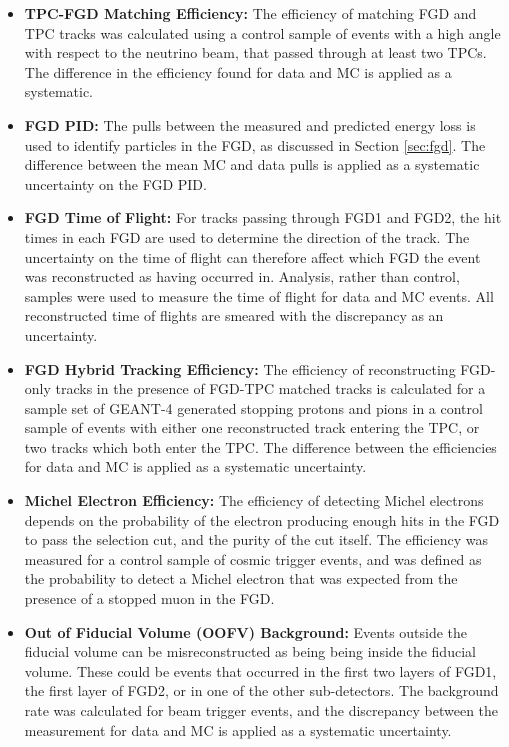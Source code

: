 \begin{itemize}
\item \textbf{TPC-FGD Matching Efficiency:} The efficiency of matching FGD and TPC tracks was calculated using a control sample of events with a high angle with respect to the neutrino beam, that passed through at least two TPCs. The difference in the efficiency found for data and MC is applied as a systematic.

\item \textbf{FGD PID:} The pulls between the measured and predicted energy loss is used to identify particles in the FGD, as discussed in Section \ref{sec:fgd}. The difference between the mean MC and data pulls is applied as a systematic uncertainty on the FGD PID.

\item \textbf{FGD Time of Flight:} For tracks passing through FGD1 and FGD2, the hit times in each FGD are used to determine the direction of the track. The uncertainty on the time of flight can therefore affect which FGD the event was reconstructed as having occurred in. Analysis, rather than control, samples were used to measure the time of flight for data and MC events. All reconstructed time of flights are smeared with the discrepancy as an uncertainty.

\item \textbf{FGD Hybrid Tracking Efficiency:} The efficiency of reconstructing FGD-only tracks in the presence of FGD-TPC matched tracks is calculated for a sample set of \textsc{GEANT-4} generated stopping protons and pions in a control sample of events with either one reconstructed track entering the TPC, or two tracks which both enter the TPC. The difference between the efficiencies for data and MC is applied as a systematic uncertainty.

\item \textbf{Michel Electron Efficiency:} The efficiency of detecting Michel electrons depends on the probability of the electron producing enough hits in the FGD to pass the selection cut, and the purity of the cut itself. The efficiency was measured for a control sample of cosmic trigger events, and was defined as the probability to detect a Michel electron that was expected from the presence of a stopped muon in the FGD.

\item \textbf{Out of Fiducial Volume (OOFV) Background:} Events outside the fiducial volume can be misreconstructed as being being inside the fiducial volume. These could be events that occurred in the first two layers of FGD1, the first layer of FGD2, or in one of the other sub-detectors. The background rate was calculated for beam trigger events, and the discrepancy between the measurement for data and MC is applied as a systematic uncertainty.


\end{itemize}
